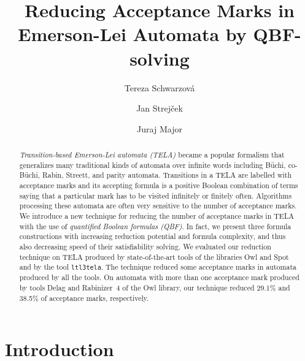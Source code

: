 \documentclass[a4paper,UKenglish,cleveref,autoref,thm-restate]{lipics-v2021}
\title{Reducing Acceptance Marks in Emerson-Lei Automata by QBF-solving}
\author{Tereza Schwarzov\'{a}}{Faculty of Informatics, Masaryk University, Brno, Czech Republic}{xschwar3@mail.muni.cz}{}{}
\author{Jan Strej\v{c}ek}{Faculty of Informatics, Masaryk University, Brno, Czech Republic}{strejcek@fi.muni.cz}{https://orcid.org/0000-0001-5873-403X}{}
\author{Juraj Major}{Faculty of Informatics, Masaryk University, Brno, Czech Republic}{major@fi.muni.cz}{}{}
\begin{document}
\maketitle


\begin{abstract}
  \emph{Transition-based Emerson-Lei automata (TELA)} became a popular
  formalism that generalizes many traditional kinds of automata over
  infinite words including Büchi, co-Büchi, Rabin, Streett, and parity
  automata. Transitions in a TELA are labelled with acceptance marks
  and its accepting formula is a positive Boolean combination of terms
  saying that a particular mark has to be visited infinitely or
  finitely often. %
  Algorithms processing these automata are often very sensitive to the
  number of %
  acceptance marks. We introduce a new technique for reducing the number
  of %
  acceptance marks in TELA with the use of \emph{quantified Boolean
    formulas (QBF)}.
  In fact, we present three formula constructions
  with increasing reduction potential and formula complexity, and thus
  also decreasing speed of their satisfiability solving. We evaluated
  our reduction technique on TELA produced by state-of-the-art tools
  of the libraries Owl and Spot and by the tool \texttt{ltl3tela}. The
  technique reduced some acceptance marks in automata produced by all
  the tools. On automata with more than one acceptance mark produced
  by tools Delag and Rabinizer~4 of the Owl library, our technique reduced
  29.1\% and 38.5\% of acceptance marks, respectively.
\end{abstract}



\section{Introduction}
\end{document}
